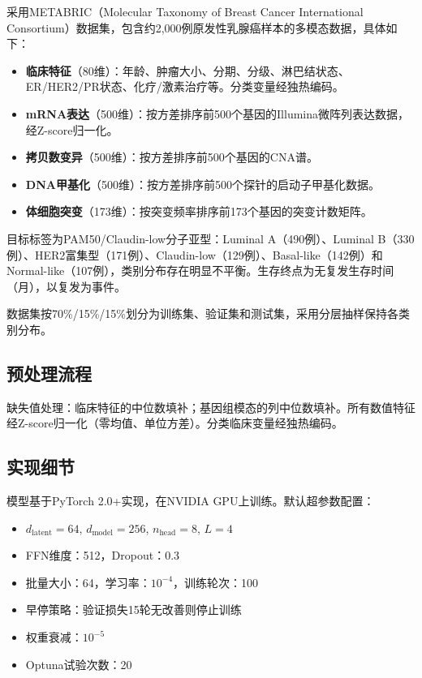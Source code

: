 \documentclass[conference]{IEEEtran}
\begin{document}
采用METABRIC（Molecular Taxonomy of Breast Cancer International Consortium）数据集\cite{curtis2012genomic}，包含约2,000例原发性乳腺癌样本的多模态数据，具体如下：

\begin{itemize}
    \item \textbf{临床特征}（80维）：年龄、肿瘤大小、分期、分级、淋巴结状态、ER/HER2/PR状态、化疗/激素治疗等。分类变量经独热编码。
    \item \textbf{mRNA表达}（500维）：按方差排序前500个基因的Illumina微阵列表达数据，经Z-score归一化。
    \item \textbf{拷贝数变异}（500维）：按方差排序前500个基因的CNA谱。
    \item \textbf{DNA甲基化}（500维）：按方差排序前500个探针的启动子甲基化数据。
    \item \textbf{体细胞突变}（173维）：按突变频率排序前173个基因的突变计数矩阵。
\end{itemize}

目标标签为PAM50/Claudin-low分子亚型：Luminal A（490例）、Luminal B（330例）、HER2富集型（171例）、Claudin-low（129例）、Basal-like（142例）和Normal-like（107例），类别分布存在明显不平衡。生存终点为无复发生存时间（月），以复发为事件。

数据集按70\%/15\%/15\%划分为训练集、验证集和测试集，采用分层抽样保持各类别分布。

\subsection{预处理流程}

缺失值处理：临床特征的中位数填补；基因组模态的列中位数填补。所有数值特征经Z-score归一化（零均值、单位方差）。分类临床变量经独热编码。

\subsection{实现细节}

模型基于PyTorch 2.0+实现，在NVIDIA GPU上训练。默认超参数配置：
\begin{itemize}
    \item $d_{\text{latent}} = 64$, $d_{\text{model}} = 256$, $n_{\text{head}} = 8$, $L = 4$
    \item FFN维度：512，Dropout：0.3
    \item 批量大小：64，学习率：$10^{-4}$，训练轮次：100
    \item 早停策略：验证损失15轮无改善则停止训练
    \item 权重衰减：$10^{-5}$
    \item Optuna试验次数：20
\end{itemize}
\end{document}
